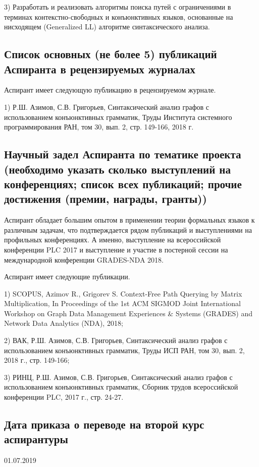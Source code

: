 \documentclass[12pt]{article}  %
\theoremstyle{remark}
\begin{document}
3) Разработать и реализовать алгоритмы поиска путей с ограничениями в терминах контекстно-свободных и конъюнктивных языков, основанные на нисходящем (Generalized LL) алгоритме синтаксического анализа.

\subsection{Список основных (не более 5) публикаций Аспиранта в рецензируемых журналах}
Аспирант имеет следующую публикацию в рецензируемом журнале.

1) Р.Ш. Азимов, С.В. Григорьев, Синтаксический анализ графов с использованием конъюнктивных грамматик, Труды Института системного программирования РАН, том 30, вып. 2, стр. 149-166, 2018 г.
\subsection{Научный задел Аспиранта по тематике проекта (необходимо указать сколько выступлений на конференциях; список всех публикаций; прочие достижения (премии, награды, гранты))}
Аспирант обладает большим опытом в применении теории формальных языков к различным задачам, что подтверждается рядом публикаций и выступлениями на профильных конференциях. А именно, выступление на всероссийской конференции PLC 2017 и выступление и участие в постерной сессии на международной конференции GRADES-NDA 2018.

Аспирант имеет следующие публикации.

1) SCOPUS, Azimov R., Grigorev S. Context-Free Path Querying by Matrix Multiplication, In Proceedings of the 1st ACM SIGMOD Joint International Workshop on Graph Data Management Experiences \& Systems (GRADES) and Network Data Analytics (NDA), 2018;

2) ВАК, Р.Ш. Азимов, С.В. Григорьев, Синтаксический анализ графов с использованием конъюнктивных грамматик, Труды ИСП РАН, том 30, вып. 2, 2018 г., стр. 149-166;

3) РИНЦ,  Р.Ш. Азимов, С.В. Григорьев, Синтаксический анализ графов с использованием конъюнктивных грамматик, Сборник трудов всероссийской конференции PLC, 2017 г., стр. 24-27.

\subsection{Дата приказа о переводе на второй курс аспирантуры}
01.07.2019
\end{document}
